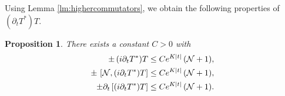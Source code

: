 \documentclass[11pt,a4paper]{article}
\newtheorem{proposition}[thm]{Proposition}
\newcommand{\ech}[2]{#2}	%
\newcommand{\ekt}{e^{K\lvert t\rvert}}	%
\newcommand{\cN}{{\cal N}}
\begin{document}
Using Lemma \ref{lm:highercommutators}, we obtain the following properties of $(\partial_t T^*)T$.
\begin{proposition}
There exists a constant $C>0$ with 
\begin{equation}\begin{split}
\label{eq:prT-cl1}  \pm \, (i\partial_t T^*) T &\leq C \ech{\|
\varphi_t^{(N)} \|_{H^2}}{\ekt} \,  (\cN +1), \\
\pm \, \left[ \cN , (i\partial_t T^*) T \right]  &\leq C \ech{\|
\varphi_t^{(N)} \|_{H^2}}{\ekt} \, (\cN + 1), \\
\pm \partial_t \left[ (i\partial_t T^*) T \right] &\leq C \ech{(\| \varphi_t^{(N)} \|^2_{H^2} + \| \varphi_t^{(N)} \|_{H^4})}{\ekt} \, (\cN +1). 
\end{split}
\end{equation}
\end{proposition}
\end{document}
